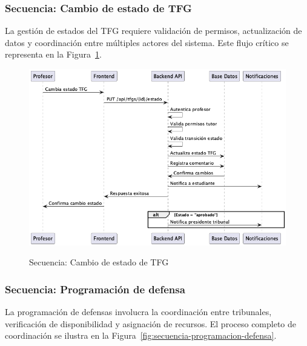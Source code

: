 \documentclass[12pt,a4paper,oneside]{report}
\providecommand{\pandocbounded}[1]{#1}
\begin{document}
\subsubsection{Secuencia: Cambio de estado de
TFG}\label{secuencia-cambio-de-estado-de-tfg}

La gestión de estados del TFG requiere validación de permisos, actualización de datos y coordinación entre múltiples actores del sistema. Este flujo crítico se representa en la Figura~\ref{fig:secuencia-cambio-estado}.

\begin{figure}[H]
\centering
\pandocbounded{\includegraphics[keepaspectratio,alt={Secuencia: Cambio de estado de TFG}]{processed/images/04_analisis_sistema_plantuml_2.png}}
\caption{Secuencia: Cambio de estado de TFG}
\label{fig:secuencia-cambio-estado}
\end{figure}

\subsubsection{Secuencia: Programación de
defensa}\label{secuencia-programaciuxf3n-de-defensa}

La programación de defensas involucra la coordinación entre tribunales, verificación de disponibilidad y asignación de recursos. El proceso completo de coordinación se ilustra en la Figura~\ref{fig:secuencia-programacion-defensa}.
\end{document}

